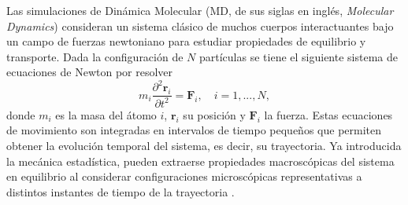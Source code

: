 Las simulaciones de Dinámica Molecular (MD, de sus siglas en inglés, 
\textit{Molecular Dynamics}) consideran un sistema clásico de muchos cuerpos 
interactuantes bajo un campo de fuerzas newtoniano para estudiar propiedades de 
equilibrio y transporte. Dada la configuración de $N$ partículas se tiene el 
siguiente sistema de ecuaciones de Newton por resolver
\begin{equation}
    m_i \frac{\partial^2 \mathbf{r}_i}{\partial t^2} = \mathbf{F}_i, \quad i = 1,..., N,
\end{equation}
donde $m_i$ es la masa del átomo $i$, $\mathbf{r}_i$ su posición y $\mathbf{F}_i$
la fuerza. Estas ecuaciones de movimiento son integradas en intervalos de tiempo
pequeños que permiten obtener la evolución temporal del sistema, es decir, su
trayectoria. Ya introducida la mecánica estadística, pueden extraerse propiedades
macroscópicas del sistema en equilibrio al considerar configuraciones microscópicas
representativas a distintos instantes de tiempo de la trayectoria
\cite{allen2017, frenkel2001}.

